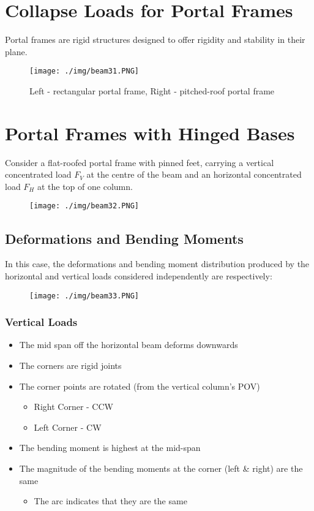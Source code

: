 \section{Collapse Loads for Portal Frames}
Portal frames are rigid structures designed to offer rigidity and stability in their plane.
\begin{figure}[H]
  \centering
  \texttt{[image: ./img/beam31.PNG]}
  \caption{Left - rectangular portal frame, Right - pitched-roof portal frame}
\end{figure}
\section{Portal Frames with Hinged Bases}
Consider a flat-roofed portal frame with pinned feet, carrying a vertical concentrated load $F_V$ at the centre of the beam and an horizontal concentrated load $F_H$ at the top of one column.
\begin{figure}[H]
  \centering
  \texttt{[image: ./img/beam32.PNG]}
\end{figure}
\subsection{Deformations and Bending Moments}
In this case, the deformations and bending moment distribution produced by the horizontal and vertical loads considered independently are respectively:
\begin{figure}[H]
  \centering
  \texttt{[image: ./img/beam33.PNG]}
\end{figure}
\subsubsection{Vertical Loads}
\begin{itemize}
  \item The mid span off the horizontal beam deforms downwards
  \item The corners are rigid joints
  \item The corner points are rotated (from the vertical column's POV)
        \begin{itemize}
          \item Right Corner - CCW
          \item Left Corner - CW
        \end{itemize}
  \item The bending moment is highest at the mid-span
  \item The magnitude of the bending moments at the corner (left \& right) are the same
        \begin{itemize}
          \item The arc indicates that they are the same
        \end{itemize}
\end{itemize}
